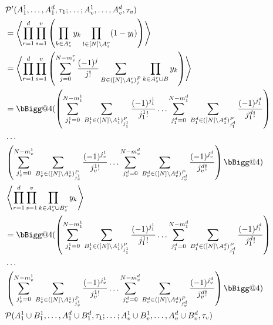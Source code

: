\documentclass[12pt]{article}
\makeatletter
\newcommand{\vast}{\bBigg@{4}}
\makeatother
\begin{document}
\begin{align}
&\mathcal{P'}(A_1^1, \ldots, A_1^d, \tau_1 ; \ldots ; A_v^1, \ldots,A_v^d,\tau_v)\\
&= \Braket{\prod_{r=1}^d \prod_{s=1}^v \left(\prod_{k \in A_s^r} y_k \prod_{l \in [N]\setminus A_s^r} (1-y_l) \right)}\\
&= \Braket{\prod_{r=1}^d \prod_{s=1}^v \left( \sum_{j=0}^{N-m_s^r} \frac{(-1)^j}{j!} \sum_{B \in ([N] \setminus A_s^r)_j^P} \prod_{k \in A_s^r \cup B} y_k \right)}\\
&= \vast( \left(\sum_{j_1^1 =0}^{N-m_1^1} \sum_{B_1^1 \in ([N]\setminus A_1^1)_{j_1^1}^P} \frac{(-1)^{j_1^1}}{j_1^1!}
\ldots 
\sum_{j_1^d =0}^{N-m_1^d} \sum_{B_1^d \in ([N]\setminus A_1^d)_{j_1^d}^P} \frac{(-1)^{j_1^d}}{j_1^d!}\right)\\
&\ldots\\
&\left(\sum_{j_v^1 =0}^{N-m_v^1} \sum_{B_v^1 \in ([N]\setminus A_v^1)_{j_v^1}^P} \frac{(-1)^{j_v^1}}{j_v^1!}
\ldots 
\sum_{j_v^d =0}^{N-m_v^d} \sum_{B_v^d \in ([N]\setminus A_v^d)_{j_v^d}^P} \frac{(-1)^{j_v^d}}{j_v^d!} \right) \vast)\\
&\Braket{\prod_{r=1}^d \prod_{s=1}^v \prod_{k \in  A_s^r\cup B_s^r} y_k}\\
&= \vast( \left(\sum_{j_1^1 =0}^{N-m_1^1} \sum_{B_1^1 \in ([N]\setminus A_1^1)_{j_1^1}^P} \frac{(-1)^{j_1^1}}{j_1^1!}
\ldots 
\sum_{j_1^d =0}^{N-m_1^d} \sum_{B_1^d \in ([N]\setminus A_1^d)_{j_1^d}^P} \frac{(-1)^{j_1^d}}{j_1^d!}\right)\\
&\ldots\\
&\left(\sum_{j_v^1 =0}^{N-m_v^1} \sum_{B_v^1 \in ([N]\setminus A_v^1)_{j_v^1}^P} \frac{(-1)^{j_v^1}}{j_v^1!}
\ldots 
\sum_{j_v^d =0}^{N-m_v^d} \sum_{B_v^d \in ([N]\setminus A_v^d)_{j_v^d}^P} \frac{(-1)^{j_v^d}}{j_v^d!} \right) \vast)\\
&\mathcal{P}(A_1^1 \cup B_1^1, \ldots, A_1^d \cup B_1^d, \tau_1 ; \ldots ; A_v^1 \cup B_v^1, \ldots,A_v^d \cup B_v^d,\tau_v)\\
\end{align}
\end{document}
